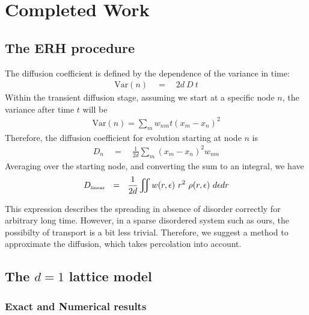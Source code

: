 \chapter{Completed Work}




\section{The ERH procedure}

The diffusion coefficient is defined by the dependence
of the variance in time:
%
\begin{align}
\textrm{Var}(n) \quad =\quad 2d\ D\ t
\end{align}
%
Within the transient diffusion stage,
assuming we start at a specific node $n$, the variance after time
$t$ will be
%
\begin{align}
\textrm{Var}(n) = \sum_m w_{nm} t (x_m-x_n)^2
\end{align}
Therefore, the diffusion coefficient for evolution 
starting at node $n$ is
%
\begin{align}
D_n \quad=\quad \frac{1}{2d}\sum_m (x_m-x_n)^2 w_{nm}
\end{align}
%
Averaging over the starting node, and converting the sum to an integral,
we have
%
\begin{align}
D_{\tbox{linear}}  \ \ = \ \ \frac{1}{2d}\iint w(r,\epsilon) \ r^2  \ \rho(r,\epsilon) \ d\epsilon dr 
\end{align}
%

This expression describes the spreading in absence of disorder correctly
for arbitrary long time. However, in a sparse disordered system such as ours,
the possibilty of transport is a bit less trivial. Therefore, we suggest
a method to approximate the diffusion, which takes percolation into account.


\section{The $d=1$ lattice model}

\subsection{Exact and Numerical results}


